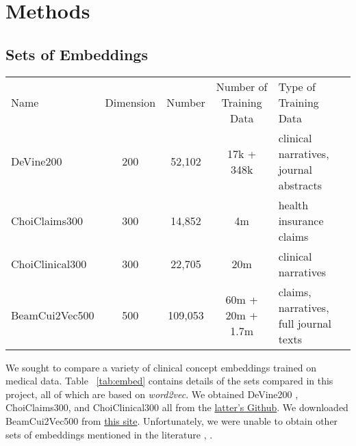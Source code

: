 \documentclass[11pt,a4paper]{article}
\begin{document}
\section{Methods}

\subsection{Sets of Embeddings}

\begin{table*}[h!]
	
	\begin{center}
		\begin{tabular}{lcccl} %
			Name & Dimension & Number & Number of Training Data& Type of Training Data \\
			\hlineB{4}
			DeVine200 & 200 & 52,102 & 17k + 348k &clinical narratives, journal abstracts\\
			\hline
			ChoiClaims300 & 300 & 14,852& 4m&health insurance claims\\
			\hline
			ChoiClinical300 & 300 & 22,705&20m& clinical narratives\\
			\hline
			BeamCui2Vec500 & 500 & 109,053&60m + 20m + 1.7m& claims, narratives, full journal texts\\
		\end{tabular}
	\end{center}
	\caption{Characteristics of the embeddings compared, including the name referred, the embedding dimensions, the number of embeddings in the dataset, and the type of data used to train them.}
	\label{tab:embed}
\end{table*}

We sought to compare a variety of clinical concept embeddings trained on medical data. Table ~\ref{tab:embed} contains details of the sets compared in this project, all of which are based on \emph{word2vec}. We obtained DeVine200 \cite{devineMedicalSemanticSimilarity2014}, ChoiClaims300, and ChoiClinical300 \cite{choiLearningLowDimensionalRepresentations2016} all from the \href{https://.com/clinicalml/embeddings}{latter's Github}. We downloaded BeamCui2Vec500 \cite{beamClinicalConceptEmbeddings2018} from \href{https://figshare.com/s/00d69861786cd0156d81}{this site}. Unfortunately, we were unable to obtain other sets of embeddings mentioned in the literature \cite{minarro-gimenezExploringApplicationDeep2014}, \cite{zhangAdaptingWordEmbeddings2018} \cite{xiangTimesensitiveClinicalConcept2019}.
\end{document}
